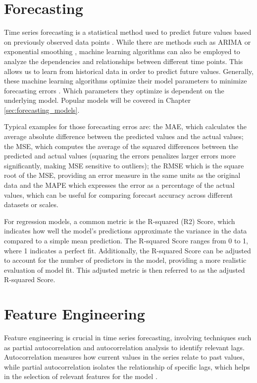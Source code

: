 \section{Forecasting}
\label{sec:Forecasting}
Time series forecasting is a statistical method used to predict future values based
on previously observed data points \parencite[ch. 5]{box2015time}. While there are
methods such as \ac{ARIMA} or exponential smoothing \parencite[ch. 5]{box2015time},
machine learning algorithms can also be employed to analyze the dependencies and
relationships between different time points. This allows us to learn from historical
data in order to predict future values. Generally, these machine learning algorithms
optimize their model parameters to minimize
forecasting errors \parencite[ch. 5]{box2015time}. Which parameters they optimize is
dependent on the underlying model. Popular models will be covered in Chapter
\ref{sec:forecasting_models}.

Typical examples for those forecasting erros are: the \ac{MAE}, which calculates
the average absolute difference between the predicted values and the actual values;
the \ac{MSE}, which computes the average of the squared differences between the
predicted and actual values (squaring the errors penalizes larger errors more
significantly, making MSE sensitive to outliers); the \ac{RMSE} which is the
square root of the \ac{MSE}, providing an error measure in the same units as
the original data and the \ac{MAPE} which expresses the error as a percentage
of the actual values, which can be useful for comparing forecast accuracy across
different datasets or scales.

For regression models, a common metric is the R-squared (R2) Score, which
indicates how well the model's predictions approximate the variance in the data compared
to a simple mean prediction. The R-squared Score ranges from 0 to 1, where 1
indicates a perfect fit. Additionally, the R-squared Score can be adjusted to
account for the number of predictors in the model, providing a more realistic
evaluation of model fit. This adjusted metric is then referred to as the adjusted
R-squared Score.

\section{Feature Engineering}
Feature engineering is crucial in time series forecasting, involving techniques
such as partial autocorrelation and autocorrelation analysis to identify relevant
lags. Autocorrelation measures how current values in the series relate to past values,
while partial autocorrelation isolates the relationship of specific lags, which helps
in the selection of relevant features for the model \parencite{box2015time}.

